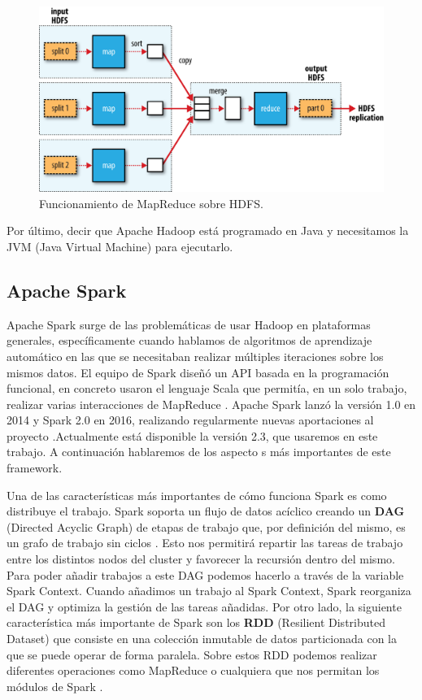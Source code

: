 \begin{figure}[htp]
\centering
\includegraphics[scale=0.28]{Imagenes/hadoop1.png}
\caption{Funcionamiento de MapReduce sobre HDFS. }
\label{hdImg1}
\end{figure}

Por último, decir que Apache Hadoop está programado en Java y necesitamos la JVM (Java Virtual Machine) para ejecutarlo.\par


\subsection{Apache Spark\label{Spark}}

Apache Spark surge de las problemáticas de usar Hadoop en plataformas generales, específicamente cuando hablamos de algoritmos de aprendizaje automático en las que se necesitaban realizar múltiples iteraciones sobre los mismos datos. El equipo de Spark diseñó un API basada en la programación funcional, en concreto usaron el lenguaje Scala que permitía, en un solo trabajo, realizar varias interacciones de MapReduce \cite{Spk-1}. Apache Spark lanzó la versión 1.0 en 2014 y Spark 2.0 en 2016, realizando regularmente nuevas aportaciones al proyecto \cite{Spk-2}.Actualmente está disponible la versión 2.3, que usaremos en este trabajo. A continuación hablaremos de los aspecto s más importantes de este framework.\par

Una de las características más importantes de cómo funciona Spark es como distribuye el trabajo. Spark soporta un flujo de datos acíclico creando un \textbf{DAG} (Directed Acyclic Graph) de etapas de trabajo que, por definición del mismo, es un grafo de trabajo sin ciclos \cite{Spk-5}. Esto nos permitirá repartir las tareas de trabajo entre los distintos nodos del cluster y favorecer la recursión dentro del mismo. Para poder añadir trabajos a este DAG podemos hacerlo a través de la variable Spark Context. Cuando añadimos un trabajo al Spark Context, Spark reorganiza el DAG y optimiza la gestión de las tareas añadidas. Por otro lado, la siguiente característica más importante de Spark son los \textbf{RDD} (Resilient Distributed Dataset) que consiste en una colección inmutable de datos particionada con la que se puede operar de forma paralela. Sobre estos RDD podemos realizar diferentes operaciones como MapReduce o cualquiera que nos permitan los módulos de Spark \cite{Spk-4}.\par

